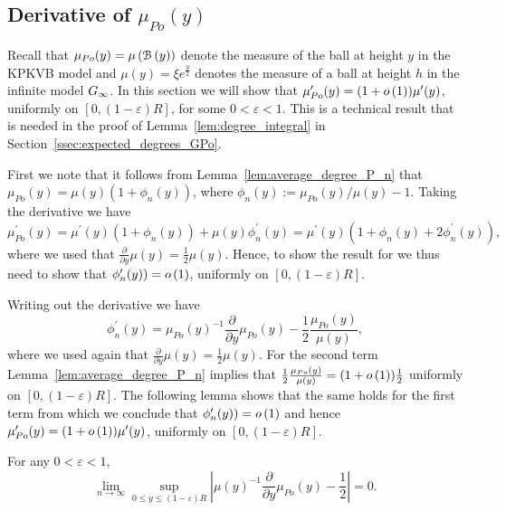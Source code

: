 \begin{appendices}
\section{Derivative of \texorpdfstring{$\mu_{Po}(y)$}{mu Po (y)}}

Recall that $\mu_{Po}(y) = \mu\left({\mathcal B}\left(y\right)\right)$ denote the measure of the ball at height $y$ in the KPKVB model and $\mu(y) = \xi e^{\frac{y}{2}}$ denotes the measure of a ball at height $h$ in the infinite model $G_{\infty}$. In this section we will show that $\mu_{Po}^\prime(y) = (1+o\left(1\right))\mu^\prime(y)$, uniformly on $[0,(1-\varepsilon)R]$, for some $0 < \varepsilon < 1$. This is a technical result that is needed in the proof of Lemma~\ref{lem:degree_integral} in Section~\ref{ssec:expected_degrees_GPo}.

First we note that it follows from Lemma~\ref{lem:average_degree_P_n} that $\mu_{Po}(y) = \mu(y)(1 + \phi_n(y))$, where $\phi_n(y) := \mu_{Po}(y)/\mu(y) - 1$. Taking the derivative we have
\[
	\mu_{Po}^\prime(y) = \mu^\prime(y)(1 + \phi_n(y)) + \mu(y)\phi_n^\prime(y)
	= \mu^\prime(y)(1 + \phi_n(y) + 2 \phi_n^\prime(y)),
\] 
where we used that $\frac{\partial}{\partial y} \mu(y) = \frac{1}{2}\mu(y)$. Hence, to show the result for we thus need to show that $\phi_n^\prime(y)) = o\left(1\right)$, uniformly on $[0,(1-\varepsilon)R]$. 

Writing out the derivative we have
\[
	\phi_n^\prime(y) = 
	\mu_{Po}(y) ^{-1} \frac{\partial}{\partial y} \mu_{Po}(y) -  \frac{1}{2} \frac{\mu_{Po}(y) }{\mu(y)},
\]
where we used again that $\frac{\partial}{\partial y} \mu(y) = \frac{1}{2}\mu(y)$. For the second term Lemma~\ref{lem:average_degree_P_n} implies that $\frac{1}{2} \frac{\mu_{Po}(y) }{\mu(y)} = (1+o\left(1\right))\frac{1}{2}$ uniformly on $[0,(1-\varepsilon)R]$. The following lemma shows that the same holds for the first term from which we conclude that $\phi_n^\prime(y)) = o\left(1\right)$ and hence $\mu_{Po}^\prime(y) = (1+o\left(1\right))\mu^\prime(y)$, uniformly on $[0,(1-\varepsilon)R]$.

\begin{lemma}\label{lem:derivative_mu_Po}
For any $0 < \varepsilon < 1$,
\[
	\lim_{n \to \infty} \sup_{0 \le y \le (1-\varepsilon)R} \left|\mu(y)^{-1}
	\frac{\partial}{\partial y} \mu_{Po}(y) - \frac{1}{2}\right| = 0.
\]
\end{lemma}


\end{appendices}
